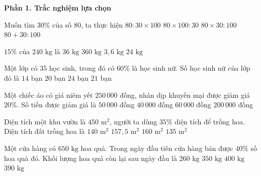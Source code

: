 \textbf{Phần 1. Trắc nghiệm lựa chọn}

\begin{ex} %
Muốn tìm $30\%$ của số $80$, ta thực hiện
\choice
{$80 : 30 \times 100$}
{$80 \times 100 : 30$}
{\True $80 \times 30 : 100$}
{$80 + 30 : 100$}
\end{ex}

\begin{ex} %
$15\%$ của $240\text{ kg}$ là
\choice
{\True $36\text{ kg}$}
{$360\text{ kg}$}
{$3{,}6\text{ kg}$}
{$24\text{ kg}$}
\end{ex}

\begin{ex} %
Một lớp có $35$ học sinh, trong đó có $60\%$ là học sinh nữ. Số học sinh nữ của lớp đó là
\choice
{$14$ bạn}
{$20$ bạn}
{$24$ bạn}
{\True $21$ bạn}
\end{ex}

\begin{ex} %
Một chiếc áo có giá niêm yết $250\,000$ đồng, nhân dịp khuyến mại được giảm giá $20\%$. Số tiền được giảm giá là
\choice
{\True $50\,000$ đồng}
{$40\,000$ đồng}
{$60\,000$ đồng}
{$200\,000$ đồng}
\end{ex}

\begin{ex} %
Diện tích một khu vườn là $450\text{ m}^2$, người ta dùng $35\%$ diện tích để trồng hoa. Diện tích đất trồng hoa là
\choice
{$140\text{ m}^2$}
{\True $157{,}5\text{ m}^2$}
{$160\text{ m}^2$}
{$135\text{ m}^2$}
\end{ex}

\begin{ex} %
Một cửa hàng có $650\text{ kg}$ hoa quả. Trong ngày đầu tiên cửa hàng bán được $40\%$ số hoa quả đó. Khối lượng hoa quả còn lại sau ngày đầu là
\choice
{$260\text{ kg}$}
{$350\text{ kg}$}
{$400\text{ kg}$}
{\True $390\text{ kg}$}
\end{ex}

